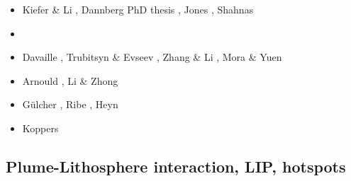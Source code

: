 \begin{scriptsize}
\begin{itemize}
\item[\twothousandsixteen] Kiefer \& Li \cite{kili16}, Dannberg PhD thesis \cite{dannbergphd}, 
                           Jones \etal \cite{jodc16}, Shahnas \etal \cite{shpy16}
\item[\twothousandseventeen] \cite{moyu17}\cite{lizh17}
\item[\twothousandeighteen] Davaille \etal \cite{dacc18}, Trubitsyn \& Evseev \cite{trev18}, 
                            Zhang \& Li \cite{zhli18}, Mora \& Yuen \cite{moyu18}
\item[\twothousandnineteen] Arnould \etal \cite{argc19}, Li \& Zhong \cite{lizh19}
\item[\twothousandtwenty] G{\"u}lcher \etal \cite{gugm20}, Ribe \etal \cite{rits20},
                          Heyn \etal \cite{hect20b}
\item[\twothousandtwentyone] Koppers \etal \cite{kobj21}
\end{itemize}
\end{scriptsize}

\subsection{Plume-Lithosphere interaction, LIP, hotspots}


